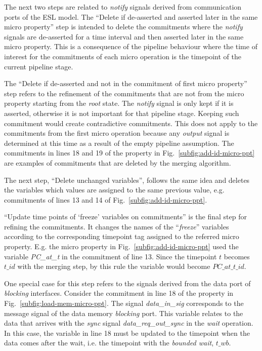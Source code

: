 The next two steps are related to \textit{notify} signals derived from communication ports of the ESL model. The “Delete if de-asserted and asserted later in the same micro property” step is intended to delete the commitments where the \textit{notify} signals are de-asserted for a time interval and then asserted later in the same micro property. This is a consequence of the pipeline behaviour where the time of interest for the commitments of each micro operation is the timepoint of the current pipeline stage.

The “Delete if de-asserted and not in the commitment of first micro property” step refers to the refinement of the commitments that are not from the micro property starting from the \textit{root} state. The \textit{notify} signal is only kept if it is asserted, otherwise it is not important for that pipeline stage. Keeping such commitment would create contradictive commitments. This does not apply to the commitments from the first micro operation because any \textit{output} signal is determined at this time as a result of the empty pipeline assumption. The commitments in lines 18 and 19 of the property in Fig.~\ref{subfig:add-id-micro-ppt} are examples of commitments that are deleted by the merging algorithm.

The next step, “Delete unchanged variables”, follows the same idea and deletes the variables which values are assigned to the same previous value, e.g. commitments of lines 13 and 14 of Fig.~\ref{subfig:add-id-micro-ppt}.

“Update time points of ‘freeze’ variables on commitments” is the final step for refining the commitments. It changes the names of the “\textit{freeze}” variables according to the corresponding timepoint tag assigned to the referred micro property. E.g. the micro property in Fig.~\ref{subfig:add-id-micro-ppt} used the variable \textit{PC\_at\_t} in the commitment of line 13. Since the timepoint $t$ becomes $t\_id$ with the merging step, by this rule the variable would become $PC\_at\_t\_id$. 

One special case for this step refers to the signals derived from the data port of \textit{blocking} interfaces. Consider the commitment in line 18 of the property in Fig.~\ref{subfig:load-mem-micro-ppt}. The signal \textit{data\_in\_sig} corresponds to the message signal of the data memory \textit{blocking} port. This variable relates to the data that arrives with the \textit{sync} signal \textit{data\_req\_out\_sync} in the \textit{wait} operation. In this case, the variable in line 18 must be updated to the timepoint when the data comes after the wait, i.e. the timepoint with the \textit{bounded wait}, $t\_wb$.

